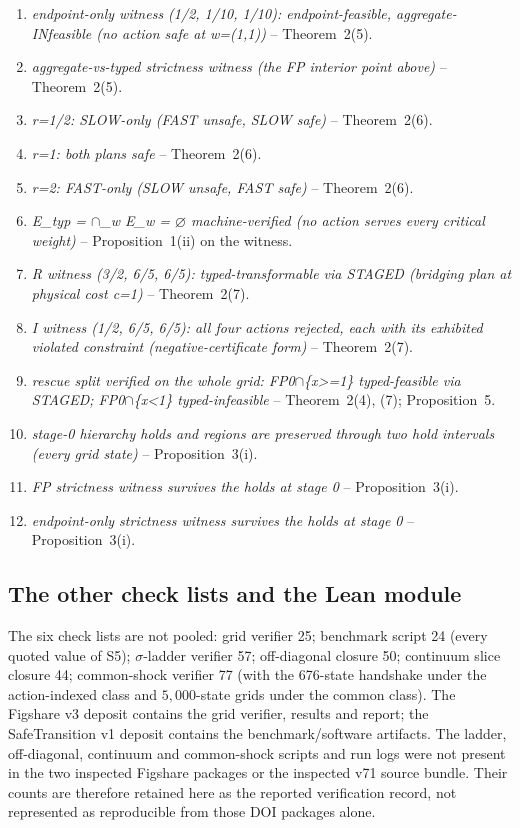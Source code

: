 \begin{enumerate}[leftmargin=2em,itemsep=1pt]
\item \emph{endpoint-only witness (1/2, 1/10, 1/10): endpoint-feasible, aggregate-INfeasible (no action safe at w=(1,1))} -- Theorem~2(5).
\item \emph{aggregate-vs-typed strictness witness (the FP interior point above)} -- Theorem~2(5).
\item \emph{r=1/2: SLOW-only (FAST unsafe, SLOW safe)} -- Theorem~2(6).
\item \emph{r=1: both plans safe} -- Theorem~2(6).
\item \emph{r=2: FAST-only (SLOW unsafe, FAST safe)} -- Theorem~2(6).
\item \emph{E\_typ = $\cap$\_w E\_w = $\varnothing$ machine-verified (no action serves every critical weight)} -- Proposition~1(ii) on the witness.
\item \emph{R witness (3/2, 6/5, 6/5): typed-transformable via STAGED (bridging plan at physical cost c=1)} -- Theorem~2(7).
\item \emph{I witness (1/2, 6/5, 6/5): all four actions rejected, each with its exhibited violated constraint (negative-certificate form)} -- Theorem~2(7).
\item \emph{rescue split verified on the whole grid: FP0$\cap$\{x>=1\} typed-feasible via STAGED; FP0$\cap$\{x<1\} typed-infeasible} -- Theorem~2(4), (7); Proposition~5.
\item \emph{stage-0 hierarchy holds and regions are preserved through two hold intervals (every grid state)} -- Proposition~3(i).
\item \emph{FP strictness witness survives the holds at stage 0} -- Proposition~3(i).
\item \emph{endpoint-only strictness witness survives the holds at stage 0} -- Proposition~3(i).
\end{enumerate}

\subsection{The other check lists and the Lean module}

The six check lists are not pooled: grid verifier 25; benchmark script 24 (every quoted value of S5); $\sigma$-ladder verifier 57; off-diagonal closure 50; continuum slice closure 44; common-shock verifier 77 (with the 676-state handshake under the action-indexed class and $5{,}000$-state grids under the common class). The Figshare v3 deposit contains the grid verifier, results and report; the SafeTransition v1 deposit contains the benchmark/software artifacts. The ladder, off-diagonal, continuum and common-shock scripts and run logs were not present in the two inspected Figshare packages or the inspected v71 source bundle. Their counts are therefore retained here as the reported verification record, not represented as reproducible from those DOI packages alone.

